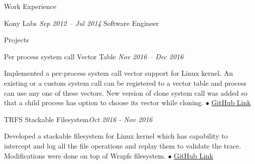 \documentclass{resume} %
\begin{document}
\begin{rSection}{Work Experience}
\begin{rSubsection}{Kony Labs} {\emph{Sep 2012 -- Jul 2014}} {Software Engineer}
\end{rSubsection}


\end{rSection}

\begin{rSection}{Projects}



\begin{rSubsection}{Per process system call Vector Table} {\emph {Nov 2016 -- Dec 2016}}{}{}
\item Implemented a per-process system call vector support for Linux kernel. An existing or a custom system call can be registered to a vector table and process can use any one of these vectors. New version of clone system call was added so that a child process has option to choose its vector while cloning.
{\tiny$\bullet$}
\href{https://github.com/t-lohani/Per-process-system-call}{GitHub Link}
\end{rSubsection}


\begin{rSubsection}{TRFS Stackable Filesystem}{\emph{Oct 2016 - Nov 2016}}{}{}
\item Developed a stackable filesystem for Linux kernel which has capability to intercept and log all the file operations and replay them to validate the trace. Modifications were done on top of Wrapfs filesystem.
{\tiny$\bullet$}
\href{https://github.com/t-lohani/TRFS-Stackable-Filesystem}{GitHub Link}
\end{rSubsection}




\end{rSection}
\end{document}
